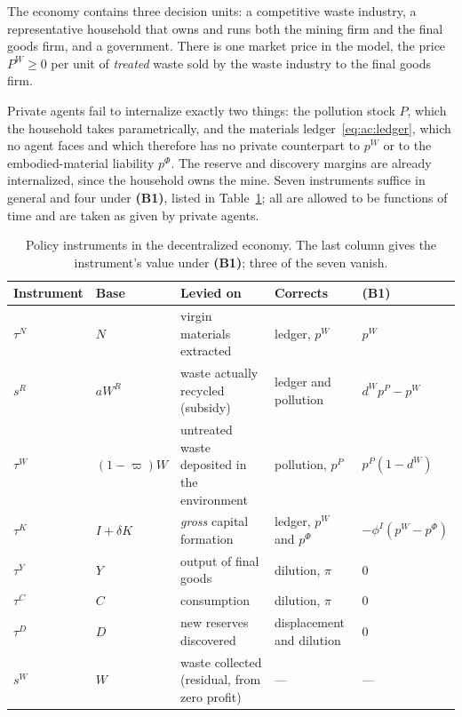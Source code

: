 The economy contains three decision units: a competitive waste industry, a representative household that owns and runs both the mining firm and the final goods firm, and a government. There is one market price in the model, the price $P^W\ge 0$ per unit of \emph{treated} waste sold by the waste industry to the final goods firm.

 Private agents fail to internalize exactly two things: the pollution stock $P$, which the household takes parametrically, and the materials ledger~\eqref{eq:ac:ledger}, which no agent faces and which therefore has no private counterpart to $p^W$ or to the embodied-material liability $p^\Phi$. The reserve and discovery margins are already internalized, since the household owns the mine. Seven instruments suffice in general and four under \textbf{(B1)}, listed in Table~\ref{tab:ad:instruments}; all are allowed to be functions of time and are taken as given by private agents.

\begin{table}[H]
\centering
\caption{Policy instruments in the decentralized economy. The last column gives the instrument's value under \textbf{(B1)}; three of the seven vanish.}
\label{tab:ad:instruments}
\renewcommand{\arraystretch}{0.85}
\begin{tabular}{@{}lllll@{}}
\toprule
Instrument & Base & Levied on & Corrects & \textbf{(B1)} \\
\midrule
$\tau^N$        & $N$              & virgin materials extracted                & ledger, $p^W$ & $p^W$ \\
$s^R$           & $aW^R$           & waste actually recycled (subsidy)         & ledger and pollution & $d^Wp^P-p^W$ \\
$\tau^W$        & $(1-\varpi)W$    & untreated waste deposited in the environment & pollution, $p^P$ & $p^P(1-d^W)$ \\
$\tau^K$        & $I+\delta K$     & \emph{gross} capital formation            & ledger, $p^W$ and $p^\Phi$ & $-\phi^I\left(p^W-p^\Phi\right)$ \\
\midrule
$\tau^Y$        & $Y$              & output of final goods                     & dilution, $\pi$ & $0$ \\
$\tau^C$        & $C$              & consumption                               & dilution, $\pi$ & $0$ \\
$\tau^D$        & $D$              & new reserves discovered                   & displacement and dilution & $0$ \\
\midrule
$s^W$           & $W$              & waste collected (residual, from zero profit) & --- & --- \\
\bottomrule
\end{tabular}
\end{table}

